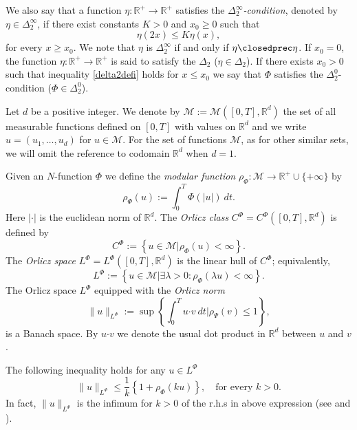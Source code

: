 \documentclass[twoside]{article}
\theoremstyle{remark}
\newcommand{\orlnor}{\|_{L^{\Phi}}}
\newcommand{\lphi}{L^{\Phi}}
\newcommand{\claseor}{C^{\Phi}}
\renewcommand{\b}[1]{\boldsymbol{#1}}
\newcommand{\rr}{\mathbb{R}}
\renewcommand{\leq}{\leqslant}
\renewcommand{\geq}{\geqslant}
\begin{document}
We also say that a function $\eta:\mathbb{R}^+\rightarrow \mathbb{R}^+$ satisfies the  \emph{$\Delta_2^{\infty}$-condition}, denoted by $\eta \in \Delta_2^{\infty}$,
if there exist  constants $K>0$ and  $x_0\geq 0$ such that
\begin{equation}\label{delta2defi}\eta(2x)\leq K\eta(x),
\end{equation}
for every $x\geq x_0$. We note that $\eta$ is $\Delta_2^{\infty}$ if and only if $\eta\closedprec\eta$.
If $x_0=0$,  the function   $\eta:\mathbb{R}^+\rightarrow \mathbb{R}^+$ is said to satisfy the $\Delta_2$ ($\eta \in \Delta_2$). If there exists $x_0>0$ such that  inequality \eqref{delta2defi} holds for $x\leq x_0$ we say that $\Phi$ satisfies the $\Delta_2^0$-condition ($\Phi\in\Delta_2^0$).



Let $d$ be a positive integer. We denote by $\mathcal{M}:=\mathcal{M}([0,T],\rr^d)$  the set of all measurable functions defined on $[0,T]$ with values on $\mathbb{R}^d$ and  we write $u=(u_1,\dots,u_d)$ for  $u\in \mathcal{M}$. For the set of functions $\mathcal{M}$, as for other similar sets, we will omit the reference to codomain $\mathbb{R}^d$ when $d=1$.


Given  an $N$-function $\Phi$ we define the \emph{modular function} 
$\rho_{\Phi}:\mathcal{M}\to \mathbb{R}^+\cup\{+\infty\}$ by
\[\rho_{\Phi}(u):= \int_0^T \Phi(|u|)\ dt.\]
Here $|\cdot|$ is the euclidean norm of $\mathbb{R}^d$.
The \emph{Orlicz class} $C^{\Phi}=C^{\Phi}([0,T],\rr^d)$  is defined  by
\begin{equation}\label{claseOrlicz}
  C^{\Phi}:=\left\{u\in \mathcal{M} | \rho_{\Phi}(u)< \infty \right\}.
\end{equation}
The \emph{Orlicz space} $\lphi=L^{\Phi}([0,T],\rr^d)$ is the linear hull of $\claseor$;
equivalently,
\begin{equation}\label{espacioOrlicz}
\lphi:=\left\{ u\in \mathcal{M}| \exists \lambda>0: \rho_{\Phi}(\lambda u) < \infty   \right\}.
\end{equation}
  The Orlicz space $\lphi$ equipped with the \emph{Orlicz norm}
\[
\|  u  \orlnor:=\sup \left\{  \int_0^T u\b{\cdot} v\ dt \big| \rho_{\Psi}(v)\leq 1\right\},
\]
is a Banach space. By $u\b{\cdot} v$ we denote the usual dot product in $\mathbb{R}^{d}$ between $u$ and $v$.

The following  inequality holds for any $u\in\lphi$
\begin{equation}\label{amemiya-ine}
\|u\orlnor\leq \frac{1}{k}\left\{1+\rho_{\Phi}(ku)\right\},\quad\text{for every } k>0.
\end{equation}
In fact, $\|u\orlnor$ is the infimum for $k>0$ of the r.h.s in above expression  (see \cite[Thm. 10.5]{KR} and \cite{hudzik2000amemiya}). 
\end{document}
